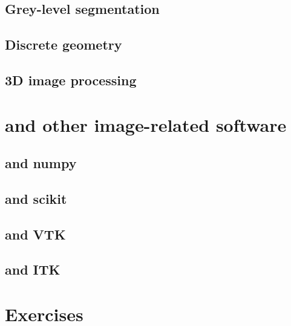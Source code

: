 \subsection{Grey-level segmentation}

\subsection{Discrete geometry}

\subsection{3D image processing}

\section{\Pink and other image-related software}

\subsection{\Pink and numpy}

\subsection{\Pink and scikit}

\subsection{\Pink and VTK}

\subsection{\Pink and ITK}

\section{Exercises}

